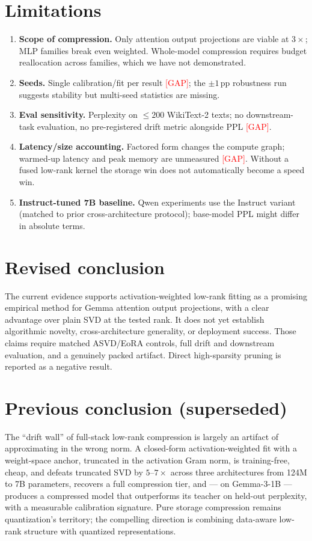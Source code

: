 \documentclass[11pt]{article}
\newcommand{\gap}{\textcolor{red}{[GAP]}}
\begin{document}
\section{Limitations}

\begin{enumerate}[leftmargin=1.5em]
  \item \textbf{Scope of compression.} Only attention output projections
    are viable at $3\times$; MLP families break even weighted. Whole-model
    compression requires budget reallocation across families, which we have
    not demonstrated.
  \item \textbf{Seeds.} Single calibration/fit per result \gap; the
    $\pm 1$\,pp robustness run suggests stability but multi-seed statistics
    are missing.
  \item \textbf{Eval sensitivity.} Perplexity on $\le 200$ WikiText-2
    texts; no downstream-task evaluation, no pre-registered drift metric
    alongside PPL \gap.
  \item \textbf{Latency/size accounting.} Factored form changes the compute
    graph; warmed-up latency and peak memory are unmeasured \gap. Without a
    fused low-rank kernel the storage win does not automatically become a
    speed win.
  \item \textbf{Instruct-tuned 7B baseline.} Qwen experiments use the
    Instruct variant (matched to prior cross-architecture protocol);
    base-model PPL might differ in absolute terms.
\end{enumerate}

\section{Revised conclusion}

The current evidence supports activation-weighted low-rank fitting as a
promising empirical method for Gemma attention output projections, with a
clear advantage over plain SVD at the tested rank. It does not yet establish
algorithmic novelty, cross-architecture generality, or deployment success.
Those claims require matched ASVD/EoRA controls, full drift and downstream
evaluation, and a genuinely packed artifact. Direct high-sparsity pruning is
reported as a negative result.

\section{Previous conclusion (superseded)}

The ``drift wall'' of full-stack low-rank compression is largely an
artifact of approximating in the wrong norm. A closed-form
activation-weighted fit with a weight-space anchor, truncated in the
activation Gram norm, is training-free, cheap, and defeats truncated SVD by
$5$--$7\times$ across three architectures from 124M to 7B parameters,
recovers a full compression tier, and --- on Gemma-3-1B --- produces a
compressed model that outperforms its teacher on held-out perplexity, with
a measurable calibration signature. Pure storage compression remains
quantization's territory; the compelling direction is combining data-aware
low-rank structure with quantized representations.
\end{document}
